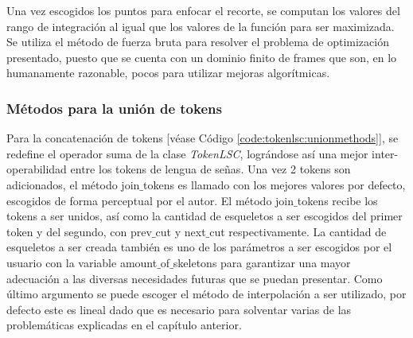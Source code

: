 Una vez escogidos los puntos para enfocar el recorte, se computan los valores del rango de integración al igual que los valores de la función para ser maximizada. Se utiliza el método de fuerza bruta para resolver el problema de optimización presentado, puesto que se cuenta con un dominio finito de frames que son, en lo humanamente razonable, pocos para utilizar mejoras algorítmicas.

\subsubsection{Métodos para la unión de tokens}
 
 Para la concatenación de tokens [véase Código \ref{code:tokenlsc:unionmethods}], se redefine el operador suma de la clase \textit{TokenLSC}, lográndose así una mejor inter-operabilidad entre los tokens de lengua de señas. Una vez 2 tokens son adicionados, el método join$\_{}$tokens es llamado con los mejores valores por defecto, escogidos de forma perceptual por el autor. El método join$\_{}$tokens recibe los tokens a ser unidos, así como la cantidad de esqueletos a ser escogidos del primer token y del segundo, con prev$\_{}$cut y next$\_{}$cut respectivamente. La cantidad de esqueletos a ser creada también es uno de los parámetros a ser escogidos por el usuario con la variable amount$\_{}$of$\_{}$skeletons para garantizar una mayor adecuación a las diversas necesidades futuras que se puedan presentar. Como último argumento se puede escoger el método de interpolación a ser utilizado, por defecto este es lineal dado que es necesario para solventar varias de las problemáticas explicadas en el capítulo anterior.
 
